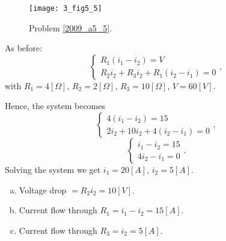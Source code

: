 \vspace{2mm}
\begin{figure}
\centerline{\texttt{[image: 3\_fig5\_5]}}
\caption{Problem \ref{2009_a5_5}.
\label{fig_a5_5}}
\end{figure}
As before:
$$
\left\{\begin{array}{c}R_1(i_1-i_2)=V \\ R_2i_2+R_3i_2+R_1(i_2-i_1)=0 \end{array}\right.,
$$
with $R_1 = 4[\Omega]$, $R_2 = 2[\Omega]$, $R_3 = 10[\Omega]$, $V=60[V]$.

Hence, the system becomes
$$
\left\{\begin{array}{c}4(i_1-i_2)=15 \\ 2i_2+10i_2+4(i_2-i_1)=0 \end{array}\right.,
$$
$$
\left\{\begin{array}{c}i_1-i_2=15 \\ 4i_2-i_1=0 \end{array}\right..
$$
Solving the system we get $i_1 = 20[A]$, $i_2=5[A]$.
\begin{enumerate}[a)]
\item Voltage drop $=R_2i_2=10[V]$.
\item Current flow through $R_1=i_1-i_2=15[A]$.
\item Current flow through $R_3=i_2=5[A]$.
\end{enumerate}

